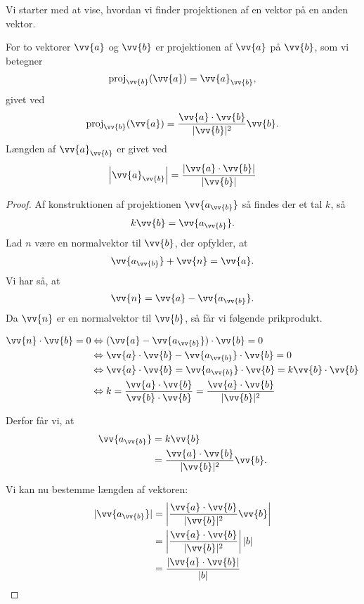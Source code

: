 Vi starter med at vise, hvordan vi finder projektionen af en vektor på en anden vektor. 
\begin{setn}[Projektionssætningen]
For to vektorer $\vv{a}$ og $\vv{b}$ er projektionen af $\vv{a}$ på $\vv{b}$, som vi betegner
\begin{align*}
\textnormal{proj}_{\vv{b}}(\vv{a}) = \vv{a}_{\vv{b}}, 
\end{align*}
givet ved
\begin{align*}
\textnormal{proj}_{\vv{b}}(\vv{a}) = \frac{\vv{a}\cdot \vv{b}}{|\vv{b}|^2} \vv{b}.
\end{align*}
Længden af  $\vv{a}_{\vv{b}}$ er givet ved
\begin{align*}
\left|\vv{a}_{\vv{b}}\right| = \frac{|\vv{a}\cdot \vv{b}|}{|\vv{b}|}
\end{align*}
\end{setn}
\begin{proof}
Af konstruktionen af projektionen $\vv{a_{\vv{b}}}$ så findes der et tal $k$, så 
\begin{align*}
k\vv{b} = \vv{a_{\vv{b}}}.
\end{align*}
Lad $n$ være en normalvektor til $\vv{b}$, der opfylder, at 
\begin{align*}
\vv{a_{\vv{b}}} + \vv{n} = \vv{a}.
\end{align*}
Vi har så, at 
\begin{align*}
\vv{n} = \vv{a} - \vv{a_{\vv{b}}}.
\end{align*}
Da $\vv{n}$ er en normalvektor til $\vv{b}$, så får vi følgende prikprodukt.

\begin{align*}
\vv{n} \cdot \vv{b}=0 &\Leftrightarrow (\vv{a}-\vv{a_{\vv{b}}}) \cdot \vv{b} = 0 \\
&\Leftrightarrow \vv{a}\cdot \vv{b} - \vv{a_{\vv{b}}}\cdot \vv{b} = 0 \\
&\Leftrightarrow \vv{a}\cdot \vv{b} = \vv{a_{\vv{b}}}\cdot \vv{b} = k \vv{b} \cdot \vv{b} \\
&\Leftrightarrow k  = \frac{\vv{a}\cdot \vv{b}}{\vv{b} \cdot \vv{b}} = \frac{\vv{a}\cdot \vv{b}}{|\vv{b}|^2}
\end{align*}

Derfor får vi, at 
\begin{align*}
\vv{a_{\vv{b}}} &= k \vv{b}\\
&= \frac{\vv{a}\cdot \vv{b}}{|\vv{b}|^2} \vv{b}.
\end{align*} 

Vi kan nu bestemme længden af vektoren:
\begin{align*}
|\vv{a_{\vv{b}}}| &= \left|\frac{\vv{a}\cdot \vv{b}}{|\vv{b}|^2}\vv{b}\right|\\
&= \left|\frac{\vv{a}\cdot \vv{b}}{|\vv{b}|^2}\right||b| \\
&= \frac{|\vv{a} \cdot \vv{b}|}{|b|}
\end{align*}
\end{proof}


